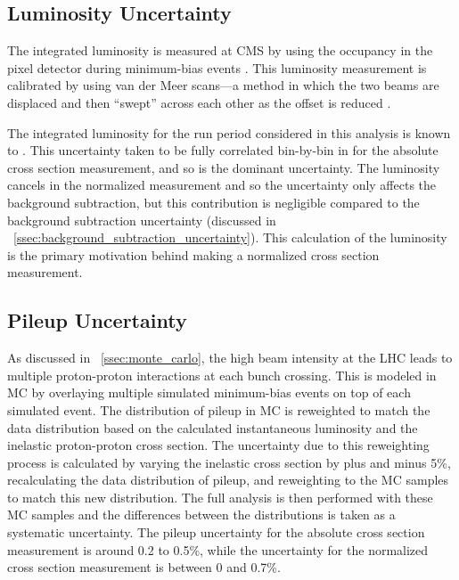 \subsection{Luminosity Uncertainty}
\label{ssec:lumi_uncertainty}

The integrated luminosity is measured at CMS by using the occupancy in the
pixel detector during minimum-bias events \cite{cms_lumi_2013}. This luminosity
measurement is calibrated by using van der Meer scans---a method in which the
two beams are displaced and then ``swept'' across each other as the offset is
reduced \cite{vandermeer_1968}.

The integrated luminosity for the run period considered in this analysis is
known to \LumiUncertainty. This uncertainty taken to be fully correlated
bin-by-bin in \phistar for the absolute cross section measurement, and so is
the dominant uncertainty. The luminosity cancels in the normalized measurement
and so the uncertainty only affects the background subtraction, but this
contribution is negligible compared to the background subtraction uncertainty
(discussed in \SEC~\ref{ssec:background_subtraction_uncertainty}). This
calculation of the luminosity is the primary motivation behind making a
normalized cross section measurement.

\subsection{Pileup Uncertainty}
\label{ssec:pileup_uncertainty}

As discussed in \SEC~\ref{ssec:monte_carlo}, the high beam intensity at the LHC
leads to multiple proton-proton interactions at each bunch crossing. This is
modeled in MC by overlaying multiple simulated minimum-bias events on top of
each simulated event. The distribution of pileup in MC is reweighted to match
the data distribution based on the calculated instantaneous luminosity and the
inelastic proton-proton cross section. The uncertainty due to this reweighting
process is calculated by varying the inelastic cross section by plus and minus
5\%, recalculating the data distribution of pileup, and reweighting to the MC
samples to match this new distribution. The full analysis is then performed
with these MC samples and the differences between the \phistar distributions is
taken as a systematic uncertainty. The pileup uncertainty for the absolute
cross section measurement is around 0.2 to 0.5\%, while the uncertainty for the
normalized cross section measurement is between 0 and 0.7\%.

